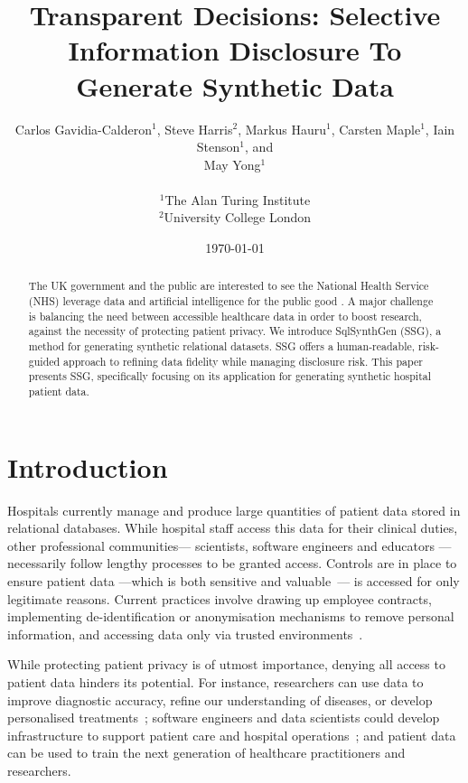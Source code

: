 \documentclass[11pt]{article}
\begin{document}
\title{Transparent Decisions: Selective Information Disclosure To Generate Synthetic Data}
\author{
Carlos Gavidia-Calderon$^1$, Steve Harris$^2$, Markus Hauru$^1$, Carsten Maple$^1$, Iain Stenson$^1$, and \\ May Yong$^1$ \\~\\
$^1$The Alan Turing Institute \\
$^2$University College London
}
\date{\today} %
\maketitle
\begin{abstract}
The UK government and the public are interested to see the National Health Service (NHS) leverage data and artificial intelligence for the public good \cite{gov2022datasaves}\cite{Jones2022}. A major challenge is balancing the need between accessible healthcare data in order to boost research, against the necessity of protecting patient privacy. We introduce SqlSynthGen (SSG), a method for generating synthetic relational datasets. SSG offers a human-readable, risk-guided approach to refining data fidelity while managing disclosure risk. This paper presents SSG, specifically focusing on its application for generating synthetic hospital patient data.
\end{abstract}

\section{Introduction}

Hospitals currently manage and produce large quantities of
patient data stored in relational databases. While hospital staff access this data for their clinical duties, other professional communities--- scientists, software engineers and educators --- necessarily follow lengthy processes to be granted access. Controls are in place to ensure patient data ---which is both sensitive and valuable~\cite{schomerus2022}--- is accessed for only legitimate reasons. Current practices involve drawing up employee contracts, implementing de-identification or anonymisation mechanisms to remove personal information, and accessing data only via trusted environments~\cite{harris2022}.

While protecting patient privacy is of utmost importance, denying all access to patient data hinders its potential. For instance, researchers can use data to improve diagnostic accuracy, refine our understanding of diseases, or develop personalised treatments~\cite{tucker2020}; software engineers and data scientists could develop infrastructure to support patient care and hospital operations~\cite{harris2022}; and patient data can be used to train the next generation of healthcare practitioners and researchers.
\end{document}

